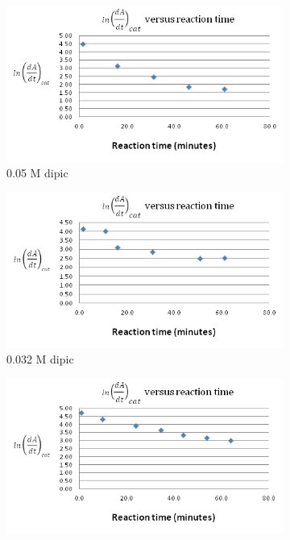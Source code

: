 \begin{figure}[h]
\begin{subfigure}{0.5\textwidth}
        \end{subfigure}
        \begin{subfigure}{0.5\textwidth}
                \includegraphics[width=\textwidth]{./Figures/05M_dipic_readings.png}
                \caption{0.05 M dipic}
                \label{fig:0.05M_dipic_readings}
        \end{subfigure}\begin{subfigure}{0.5\textwidth}
                \includegraphics[width=\textwidth]{./Figures/032M_dipic_readings.png}
                \caption{0.032 M dipic}
                \label{fig:0.032M_dipic_readings}
        \end{subfigure}
        \begin{subfigure}{0.5\textwidth}
                \includegraphics[width=\textwidth]{./Figures/016M_dipic_readings.png}

\end{subfigure}
\end{figure}
